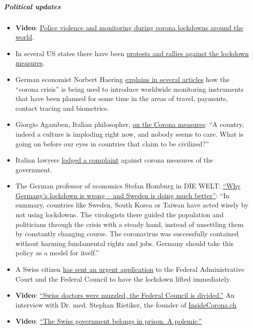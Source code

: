 \hypertarget{political-updates-2}{%
\subparagraph{\texorpdfstring{\textbf{Political
updates}}{Political updates}}\label{political-updates-2}}

\begin{itemize}
\tightlist
\item
  \textbf{Video}:
  \href{https://archive.org/details/what-in-the-world-is-actually-going-on-document-reveals-plans-step-by-step}{Police
  violence and monitoring during corona lockdowns around the world}.
\item
  In several US states there have been
  \href{https://news.yahoo.com/protests-draw-thousands-over-state-024328374.html}{protests
  and rallies against the lockdown measures}.
\item
  German economist Norbert Haering
  \href{https://norberthaering.de/}{explains in several articles} how
  the ``corona crisis'' is being used to introduce worldwide monitoring
  instruments that have been planned for some time in the areas of
  travel, payments, contact tracing and biometrics.
\item
  Giorgio Agamben, Italian philosopher,
  \href{https://www.nzz.ch/feuilleton/coronavirus-giorgio-agamben-zum-zusammenbruch-der-demokratie-ld.1551896}{on
  the Corona measures}: ``A country, indeed a culture is imploding right
  now, and nobody seems to care. What is going on before our eyes in
  countries that claim to be civilized?''
\item
  Italian lawyers
  \href{https://www.tvprato.it/2020/04/la-camera-civile-degli-avvocati-pratesi-chiede-lannullamento-del-dpcm-del-10-aprile-e-illegittimo/}{lodged
  a complaint} against corona measures of the government.
\item
  The German professor of economics Stefan Homburg in DIE WELT:
  \href{https://www.msn.com/de-de/nachrichten/coronavirus/warum-deutschlands-lockdown-falsch-ist-\%E2\%80\%93-und-schweden-vieles-besser-macht/ar-BB12E6km}{``Why
  Germany's lockdown is wrong -- and Sweden is doing much better''}:
  ``In summary, countries like Sweden, South Korea or Taiwan have acted
  wisely by not using lockdowns. The virologists there guided the
  population and politicians through the crisis with a steady hand,
  instead of unsettling them by constantly changing course. The
  coronavirus was successfully contained without harming fundamental
  rights and jobs. Germany should take this policy as a model for
  itself.''
\item
  A Swiss citizen
  \href{https://faktenb-covid-19-massnahmen.jimdofree.com/}{has sent an
  urgent application} to the Federal Administrative Court and the
  Federal Council to have the lockdown lifted immediately.
\item
  \textbf{Video}:
  \href{https://www.youtube.com/watch?v=eU6IdglI-wc}{``Swiss doctors
  were muzzled, the Federal Council is divided.''} An interview with Dr.
  med. Stephan Rietiker, the founder of
  \href{https://www.insidecorona.ch/}{InsideCorona.ch}
\item
  \textbf{Video}:
  \href{https://www.youtube.com/watch?v=SO2JMkKtq40}{``The Swiss
  government belongs in prison. A polemic.''}
\end{itemize}

